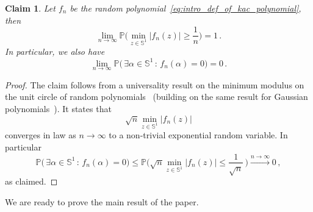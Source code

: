 \documentclass[11pt]{amsart}
\newtheorem{claim}[theorem]{Claim}
\theoremstyle{remark}
\theoremstyle{definition}
\newcommand{\bP}{\mathbb P}
\newcommand{\bS}{\mathbb S}
\begin{document}
    \begin{claim}
        \label{claim:no_root_on_unit_circle}
        Let $f_n$ be the random polynomial~\eqref{eq:intro_def_of_kac_polynomial}, then
        \[
        \lim_{n\to\infty} \bP\Big( \min_{z\in \bS^1} |f_n(z)| \ge \frac{1}{n} \Big) = 1 \, .      
        \]
        In particular, we also have
        \[
        \lim_{n\to \infty} \bP\Big( \, \exists \alpha\in \bS^1 \, : \, f_n(\alpha) = 0 \Big) = 0 \, .
        \]
    \end{claim}
    \begin{proof}
        The claim follows from a universality result on the minimum modulus on the unit circle of random polynomials~\cite[Theorem~1.2]{Cook-Nguyen} (building on the same result for Gaussian polynomials~\cite{Yakir-Zeitouni}). It states that
        \[
        \sqrt{n} \min_{z\in \bS^1} |f_n(z)|
        \]
        converges in law as $n\to \infty$ to a non-trivial exponential random variable. In particular
        \[
        \bP\Big( \, \exists \alpha\in \bS^1 \, : \, f_n(\alpha) = 0 \Big) \le  \bP\Big( \sqrt{n} \min_{z\in \bS^1} |f_n(z)| \le \frac{1}{\sqrt{n}} \, \Big)\xrightarrow{n\to\infty} 0 \, ,
        \]
        as claimed.
    \end{proof}
    We are ready to prove the main result of the paper. 
\end{document}
